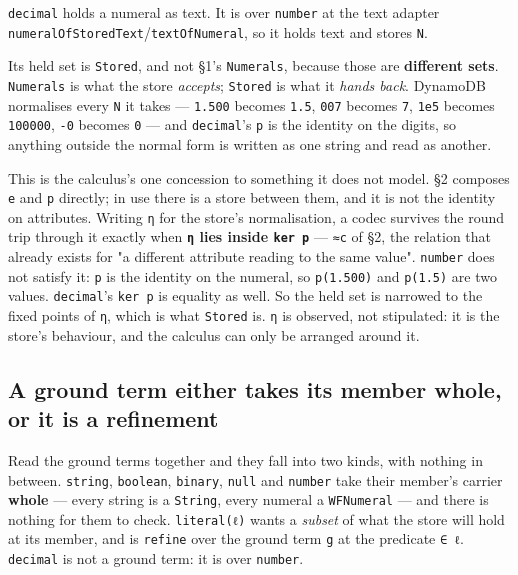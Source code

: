 \texttt{decimal} holds a numeral as text. It is  over \texttt{number} at the text adapter
\texttt{numeralOfStoredText}/\texttt{textOfNumeral}, so it holds text and stores \texttt{N}.

Its held set is \texttt{Stored}, and not §1's \texttt{Numerals}, because those are \textbf{different sets}. \texttt{Numerals}
is what the store \emph{accepts}; \texttt{Stored} is what it \emph{hands back}. DynamoDB normalises every \texttt{N} it
takes — \texttt{1.500} becomes \texttt{1.5}, \texttt{007} becomes \texttt{7}, \texttt{1e5} becomes \texttt{100000}, \texttt{-0} becomes \texttt{0} — and
\texttt{decimal}'s \texttt{p} is the identity on the digits, so anything outside the normal form is written as one
string and read as another.

This is the calculus's one concession to something it does not model. §2 composes \texttt{e} and \texttt{p}
directly; in use there is a store between them, and it is not the identity on attributes. Writing
\texttt{η} for the store's normalisation, a codec survives the round trip through it exactly when \textbf{\texttt{η}
lies inside \texttt{ker\ p}} — \texttt{≈c} of §2, the relation that already exists for "a different attribute
reading to the same value". \texttt{number} does not satisfy it: \texttt{p} is the identity on the numeral, so
\texttt{p(1.500)} and \texttt{p(1.5)} are two values. \texttt{decimal}'s \texttt{ker\ p} is equality as well. So the held set is narrowed to the
fixed points of \texttt{η}, which is what \texttt{Stored} is. \texttt{η} is observed, not stipulated: it is the store's
behaviour, and the calculus can only be arranged around it.

\subsection{A ground term either takes its member whole, or it is a refinement}\label{a-ground-term-either-takes-its-member-whole-or-it-is-a-refinement}

Read the ground terms together and they fall into two kinds, with nothing in between.
\texttt{string}, \texttt{boolean}, \texttt{binary}, \texttt{null} and \texttt{number} take their member's carrier
\textbf{whole} — every string is a \texttt{String}, every numeral a \texttt{WFNumeral} — and there is nothing for
them to check. \texttt{literal(ℓ)} wants a \emph{subset} of what the store will hold at its member, and is
\texttt{refine} over the ground term \texttt{g} at the predicate \texttt{∈\ ℓ}. \texttt{decimal} is not a ground term:
it is  over \texttt{number}.

